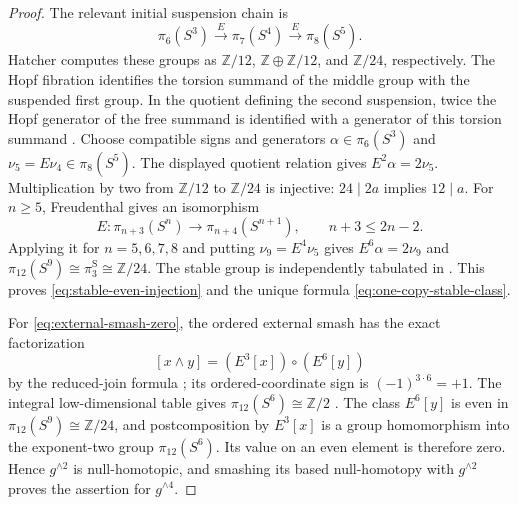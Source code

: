 \documentclass[11pt]{article}
\theoremstyle{definition}
\newcommand{\Z}{\mathbb Z}
\begin{document}
\begin{proof}
The relevant initial suspension chain is
\[
 \pi_6(S^3)\xrightarrow{E}\pi_7(S^4)
                   \xrightarrow{E}\pi_8(S^5).
\]
Hatcher computes these groups as \(\Z/12\), \(\Z\oplus\Z/12\),
and \(\Z/24\), respectively.  The Hopf fibration identifies the torsion
summand of the middle group with the suspended first group.  In the
quotient defining the second suspension, twice the Hopf generator of
the free summand is identified with a generator of this torsion summand
\cite[Theorem~5.41(b), p.~573, and pp.~577--578]
{HatcherSpectralSequences}.
Choose compatible signs and generators \(\alpha\in\pi_6(S^3)\) and
\(\nu_5=E\nu_4\in\pi_8(S^5)\).  The displayed quotient relation gives
\(E^2\alpha=2\nu_5\).  Multiplication by two from \(\Z/12\) to
\(\Z/24\) is injective: \(24\mid2a\) implies \(12\mid a\).
For \(n\ge5\), Freudenthal gives an isomorphism
\[
 E:\pi_{n+3}(S^n)\longrightarrow\pi_{n+4}(S^{n+1}),
 \qquad n+3\le2n-2.
\]
Applying it for \(n=5,6,7,8\) and putting \(\nu_9=E^4\nu_5\)
gives \(E^6\alpha=2\nu_9\) and
\(\pi_{12}(S^9)\cong\pi_3^{\mathrm S}\cong\Z/24\).
The stable group is independently tabulated in
\cite[Table~1, p.~113]{IsaksenWangXu2023}.  This proves
\eqref{eq:stable-even-injection} and the unique formula
\eqref{eq:one-copy-stable-class}.

For \eqref{eq:external-smash-zero}, the ordered external smash has the
exact factorization
\[
 [x\wedge y]=(E^3[x])\circ(E^6[y])
\]
by the reduced-join formula
\cite[Proposition~3.1]{Toda1962}; its ordered-coordinate sign is
\((-1)^{3\cdot6}=+1\).  The integral low-dimensional table gives
\(\pi_{12}(S^6)\cong\Z/2\)
\cite[opening table, p.~339]{Hatcher2002}.  The class \(E^6[y]\) is even in
\(\pi_{12}(S^9)\cong\Z/24\), and postcomposition by \(E^3[x]\) is a group
homomorphism into the exponent-two group \(\pi_{12}(S^6)\).  Its value on
an even element is therefore zero.  Hence \(g^{\wedge2}\) is
null-homotopic, and smashing its based null-homotopy with
\(g^{\wedge2}\) proves the assertion for \(g^{\wedge4}\).
\end{proof}
\end{document}
